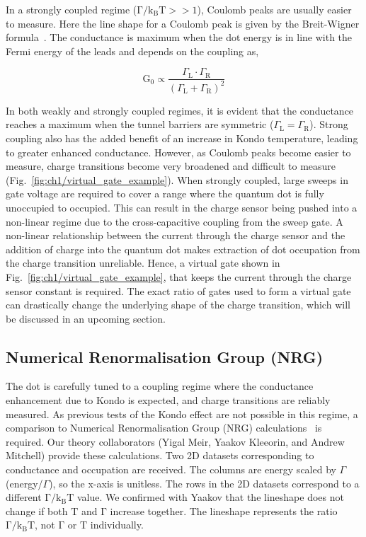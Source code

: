 In a strongly coupled regime ($\mathrm{\Gamma/k_BT}>>1$), Coulomb peaks are usually easier to measure. Here the line shape for a Coulomb peak is given by the Breit-Wigner formula~\cite{Breit1936}. The conductance is maximum when the dot energy is in line with the Fermi energy of the leads and depends on the coupling as,

\begin{equation}\label{eq:cond_amp_strong}
 \mathrm{G_0} \propto
 \frac{\Gamma_\mathrm{L}\cdot\Gamma_\mathrm{R}}{\left(\Gamma_\mathrm{L}+\Gamma_\mathrm{R}\right)^2}
\end{equation}

\noindent In both weakly and strongly coupled regimes, it is evident that the conductance reaches a maximum when the tunnel barriers are symmetric ($\Gamma_\mathrm{L}=\Gamma_\mathrm{R}$). Strong coupling also has the added benefit of an increase in Kondo temperature, leading to greater enhanced conductance. 
However, as Coulomb peaks become easier to measure, charge transitions become very broadened and difficult to measure (Fig.~\ref{fig:ch1/virtual_gate_example}). When strongly coupled, large sweeps in gate voltage are required to cover a range where the quantum dot is fully unoccupied to occupied. This can result in the charge sensor being pushed into a non-linear regime due to the cross-capacitive coupling from the sweep gate.
A non-linear relationship between the current through the charge sensor and the addition of charge into the quantum dot makes extraction of dot occupation from the charge transition unreliable. Hence, a virtual gate shown in Fig.~\ref{fig:ch1/virtual_gate_example}, that keeps the current through the charge sensor constant is required. The exact ratio of gates used to form a virtual gate can drastically change the underlying shape of the charge transition, which will be discussed in an upcoming section. 


\subsection{Numerical Renormalisation Group (NRG)}
The dot is carefully tuned to a coupling regime where the conductance enhancement due to Kondo is expected, and charge transitions are reliably measured. As previous tests of the Kondo effect are not possible in this regime, a comparison to Numerical Renormalisation Group (NRG) calculations~\cite{nrg} is required. Our theory collaborators (Yigal Meir, Yaakov Kleeorin, and Andrew Mitchell) provide these calculations. Two 2D datasets corresponding to conductance and occupation are received. The columns are energy scaled by $\Gamma$ (energy/$\Gamma$), so the x-axis is unitless. The rows in the 2D datasets correspond to a different $\mathrm{\Gamma/k_BT}$ value. We confirmed with Yaakov that the lineshape does not change if both $\mathrm{T}$ and $\mathrm{\Gamma}$ increase together. The lineshape represents the ratio $\mathrm{\Gamma/k_BT}$, not $\mathrm{\Gamma}$ or $\mathrm{T}$ individually.

